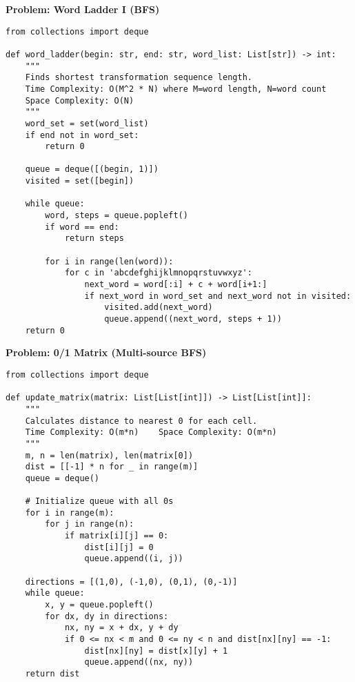 \noindent\textbf{Problem: Word Ladder I (BFS)}
\begin{verbatim}
from collections import deque

def word_ladder(begin: str, end: str, word_list: List[str]) -> int:
    """
    Finds shortest transformation sequence length.
    Time Complexity: O(M^2 * N) where M=word length, N=word count
    Space Complexity: O(N)
    """
    word_set = set(word_list)
    if end not in word_set:
        return 0
        
    queue = deque([(begin, 1)])
    visited = set([begin])
    
    while queue:
        word, steps = queue.popleft()
        if word == end:
            return steps
            
        for i in range(len(word)):
            for c in 'abcdefghijklmnopqrstuvwxyz':
                next_word = word[:i] + c + word[i+1:]
                if next_word in word_set and next_word not in visited:
                    visited.add(next_word)
                    queue.append((next_word, steps + 1))
    return 0
\end{verbatim}

\noindent\textbf{Problem: 0/1 Matrix (Multi-source BFS)}
\begin{verbatim}
from collections import deque

def update_matrix(matrix: List[List[int]]) -> List[List[int]]:
    """
    Calculates distance to nearest 0 for each cell.
    Time Complexity: O(m*n)    Space Complexity: O(m*n)
    """
    m, n = len(matrix), len(matrix[0])
    dist = [[-1] * n for _ in range(m)]
    queue = deque()
    
    # Initialize queue with all 0s
    for i in range(m):
        for j in range(n):
            if matrix[i][j] == 0:
                dist[i][j] = 0
                queue.append((i, j))
    
    directions = [(1,0), (-1,0), (0,1), (0,-1)]
    while queue:
        x, y = queue.popleft()
        for dx, dy in directions:
            nx, ny = x + dx, y + dy
            if 0 <= nx < m and 0 <= ny < n and dist[nx][ny] == -1:
                dist[nx][ny] = dist[x][y] + 1
                queue.append((nx, ny))
    return dist
\end{verbatim}

